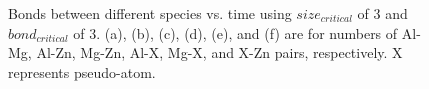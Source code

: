 \begin{figure}[!ht]
\caption[Bonds between different species vs. time using $size_{critical}$ of 3 and $bond_{critical}$ of 3.]{Bonds between different species vs. time using $size_{critical}$ of 3 and $bond_{critical}$ of 3. (a), (b), (c), (d), (e), and (f) are for numbers of Al-Mg, Al-Zn, Mg-Zn, Al-X, Mg-X, and X-Zn pairs, respectively. X represents pseudo-atom.}
\label{Chap:Al/Vac:fig:sens_bond}
\end{figure}
\endgroup


